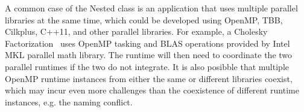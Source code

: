 A common case of the Nested class is an application that uses multiple parallel libraries at the same time, which could be developed 
using OpenMP, TBB, Cilkplus, C++11, and other parallel libraries. 
For example, a Cholesky Factorization~\cite{intertwine} %
uses OpenMP tasking and BLAS operations provided by Intel MKL parallel math library.
The runtime will then need to coordinate the two
parallel runtimes if the two do not integrate. %
It is also posibble that multiple OpenMP runtime instances from either the same or different libraries coexist, which
may incur even more challenges than the coexistence of different runtime instances, e.g. the naming conflict. 

